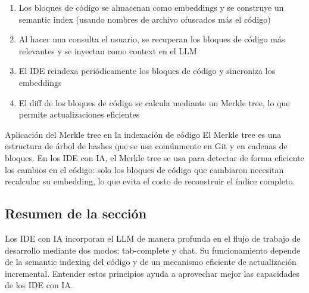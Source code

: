 \begin{enumerate}
    \item Los bloques de código se almacenan como embeddings y se construye un semantic index (usando nombres de archivo ofuscados más el código)
    \item Al hacer una consulta el usuario, se recuperan los bloques de código más relevantes y se inyectan como context en el LLM
    \item El IDE reindexa periódicamente los bloques de código y sincroniza los embeddings
    \item El diff de los bloques de código se calcula mediante un Merkle tree, lo que permite actualizaciones eficientes
\end{enumerate}

\begin{importantbox}{Aplicación del Merkle tree en la indexación de código}
El Merkle tree es una estructura de árbol de hashes que se usa comúnmente en Git y en cadenas de bloques. En los IDE con IA, el Merkle tree se usa para detectar de forma eficiente los cambios en el código: solo los bloques de código que cambiaron necesitan recalcular su embedding, lo que evita el costo de reconstruir el índice completo.
\end{importantbox}

\subsection{Resumen de la sección}

Los IDE con IA incorporan el LLM de manera profunda en el flujo de trabajo de desarrollo mediante dos modos: tab-complete y chat. Su funcionamiento depende de la semantic indexing del código y de un mecanismo eficiente de actualización incremental. Entender estos principios ayuda a aprovechar mejor las capacidades de los IDE con IA.

